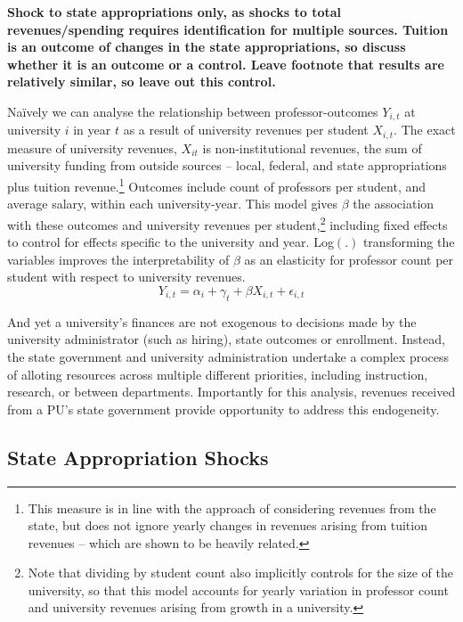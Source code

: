 \documentclass[notitlepage,12pt]{article}
\begin{document}
\textbf{Shock to state appropriations only, as shocks to total revenues/spending requires identification for multiple sources.
Tuition is an outcome of changes in the state appropriations, so discuss whether it is an outcome or a control.
Leave footnote that results are relatively similar, so leave out this control.}

Na\"ively we can analyse the relationship between professor-outcomes $Y_{i,t}$ at university $i$ in year $t$ as a result of university revenues per student $X_{i,t}$.
The exact measure of university revenues, $X_{it}$ is non-institutional revenues, the sum of university funding from outside sources -- local, federal, and state appropriations plus tuition revenue.\footnote{
    This measure is in line with the \cite{NBERw27885} approach of considering revenues from the state, but does not ignore yearly changes in revenues arising from tuition revenues -- which are shown to be heavily related.
}
Outcomes include count of professors per student, and average salary, within each university-year.
This model gives $\beta$ the association with these outcomes and university revenues per student,\footnote{
    Note that dividing by student count also implicitly controls for the size of the university, so that this model accounts for yearly variation in professor count and university revenues arising from growth in a university.
}
including fixed effects to control for effects specific to the university and year.
Log$(.)$ transforming the variables improves the interpretability of $\beta$ as an elasticity for professor count per student with respect to university revenues.
\begin{equation}
    \label{eqn:naivereg}
    Y_{i,t} = \alpha_i + \gamma_t + \beta X_{i,t} + \epsilon_{i,t}
\end{equation}

And yet a university's finances are not exogenous to decisions made by the university administrator (such as hiring), state outcomes or enrollment.
Instead, the state government and university administration undertake a complex process of alloting resources across multiple different priorities, including instruction, research, or between departments.
Importantly for this analysis, revenues received from a  PU's state government provide opportunity to address this endogeneity.


\subsection{State Appropriation Shocks}
\label{sec:approp-shocks}
\end{document}
